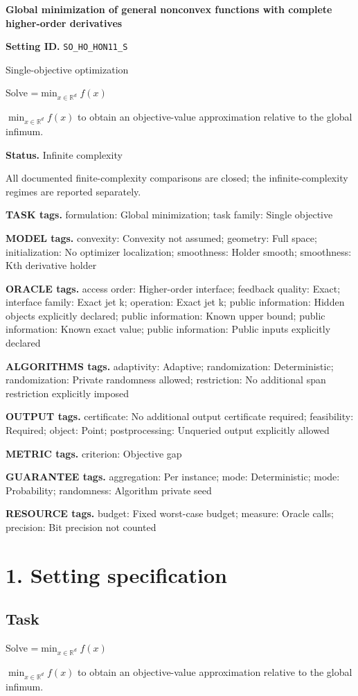 \documentclass[10pt,a4paper]{article}
\newcommand{\AtlasMath}[1]{\par\begingroup\centering\setbox0=\hbox{$\displaystyle #1$}\ifdim\wd0>1.4\linewidth\typeout{ATLAS WIDE FORMULA: \the\wd0}\fi\ifdim\wd0>\linewidth\resizebox{\linewidth}{!}{\box0}\else\box0\fi\par\endgroup}
\newcommand{\AtlasInlineMath}[1]{\begingroup\setbox0=\hbox{$#1$}\ifdim\wd0>.4\linewidth\endgroup\AtlasMath{#1}\else\endgroup$#1$\fi}
\begin{document}
\raggedright

{\LARGE\bfseries\sffamily\color{AtlasNavy} Global minimization of general nonconvex functions with complete higher-order derivatives\par}\vspace{5pt}
\textbf{Setting ID.} \texttt{SO\_\allowbreak{}HO\_\allowbreak{}HON11\_\allowbreak{}S}

Single-objective optimization

Solve \AtlasInlineMath{\min_{x\in \mathbb{R}^d}f(x)} to obtain an objective-value approximation relative to the global infimum.

\textbf{Status.} Infinite complexity

All documented finite-complexity comparisons are closed; the infinite-complexity regimes are reported separately.

\textbf{TASK tags.} formulation: Global minimization; task family: Single objective

\textbf{MODEL tags.} convexity: Convexity not assumed; geometry: Full space; initialization: No optimizer localization; smoothness: Holder smooth; smoothness: Kth derivative holder

\textbf{ORACLE tags.} access order: Higher-order interface; feedback quality: Exact; interface family: Exact jet k; operation: Exact jet k; public information: Hidden objects explicitly declared; public information: Known upper bound; public information: Known exact value; public information: Public inputs explicitly declared

\textbf{ALGORITHMS tags.} adaptivity: Adaptive; randomization: Deterministic; randomization: Private randomness allowed; restriction: No additional span restriction explicitly imposed

\textbf{OUTPUT tags.} certificate: No additional output certificate required; feasibility: Required; object: Point; postprocessing: Unqueried output explicitly allowed

\textbf{METRIC tags.} criterion: Objective gap

\textbf{GUARANTEE tags.} aggregation: Per instance; mode: Deterministic; mode: Probability; randomness: Algorithm private seed

\textbf{RESOURCE tags.} budget: Fixed worst-case budget; measure: Oracle calls; precision: Bit precision not counted

\section{1. Setting specification}
\subsection{Task}
Solve \AtlasInlineMath{\min_{x\in \mathbb{R}^d}f(x)} to obtain an objective-value approximation relative to the global infimum.
\end{document}
